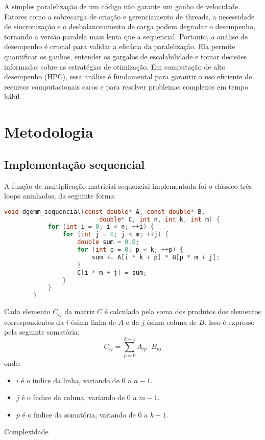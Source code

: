 \documentclass[12pt, a4paper]{article}
\begin{document}
	A simples paralelização de um código não garante um ganho de velocidade. Fatores
	como a sobrecarga de criação e gerenciamento de threads, a necessidade de
	sincronização e o desbalanceamento de carga podem degradar o desempenho, tornando
	a versão paralela mais lenta que a sequencial. Portanto, a análise de desempenho
	é crucial para validar a eficácia da paralelização. Ela permite quantificar os
	ganhos, entender os gargalos de escalabilidade e tomar decisões informadas sobre
	as estratégias de otimização. Em computação de alto desempenho (HPC), essa análise
	é fundamental para garantir o uso eficiente de recursos computacionais caros e
	para resolver problemas complexos em tempo hábil.

	\newpage
	\section{Metodologia}

	\subsection{Implementação sequencial}

	A função de multiplicação matricial sequencial implementada foi o clássico
	três loops aninhados, da seguinte forma:

	\begin{lstlisting}[language=C]
		void dgemm_sequencial(const double* A, const double* B, 
                          double* C, int n, int k, int m) {
            for (int i = 0; i < n; ++i) {
                for (int j = 0; j < m; ++j) {
                    double sum = 0.0;
                    for (int p = 0; p < k; ++p) {
                        sum += A[i * k + p] * B[p * m + j];
                    }
                    C[i * m + j] = sum;
                }
            }
        }
	\end{lstlisting}

	Cada elemento $C_{ij}$ da matriz $C$ é calculado pela soma dos produtos dos
	elementos correspondentes da $i$-ésima linha de $A$ e da $j$-ésima coluna de
	$B$. Isso é expresso pela seguinte somatória:
	\[
		C_{ij}= \sum_{p=0}^{k-1}A_{ip}\cdot B_{pj}
	\]
	onde:
	\begin{itemize}
		\item $i$ é o índice da linha, variando de $0$ a $n-1$.

		\item $j$ é o índice da coluna, variando de $0$ a $m-1$.

		\item $p$ é o índice da somatória, variando de $0$ a $k-1$.
	\end{itemize}
	Complexidade
\end{document}
